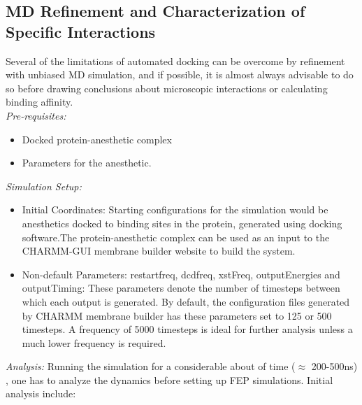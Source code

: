 \documentclass[12pt]{article}
\begin{document}
\subsection{MD Refinement and Characterization of Specific Interactions}
\label{sec:unbiasedMD}
Several of the limitations of automated docking can be overcome by refinement with unbiased MD simulation, and if possible, it is almost always advisable to do so before drawing conclusions about microscopic interactions or calculating binding affinity.\hfill \break
\\

\noindent\textit{Pre-requisites:} 
\begin{itemize}
 \item Docked protein-anesthetic complex
 \item Parameters for the anesthetic.
\end{itemize}
\textit{Simulation Setup:}
\begin{itemize}
 \item Initial Coordinates: Starting configurations for the simulation would be anesthetics docked to binding sites in the protein, generated using docking software.The protein-anesthetic complex can be used as an input to the  CHARMM-GUI membrane builder website\cite{Jo2009} to build the system.

\item Non-default Parameters: 
	restartfreq, dcdfreq, xstFreq, outputEnergies and outputTiming: These parameters denote the number of timesteps between which each output is generated. By default, the configuration files generated by CHARMM membrane builder has these parameters set to 125 or 500 timesteps. A frequency of 5000 timesteps is ideal for further analysis unless a much lower frequency is required.
 \end{itemize}
\textit{Analysis:}
Running the simulation for a considerable about of time ($\approx$ 200-500ns) , one has to analyze the dynamics before setting up FEP simulations. Initial analysis include:  
\end{document}
